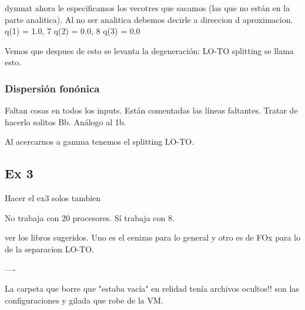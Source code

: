 dynmat ahora le especificamos los vecotres que sacamos (las que no están en la parte analitica). Al no ser analitica debemos decirle a direccion d aproximacion.
q(1) = 1.0,
7     q(2) = 0.0,
8     q(3) = 0.0

Vemos que despues de esto se levanta la degeneración: LO-TO splitting se llama esto.

\subsubsection{Dispersión fonónica}


Faltan cosas en todos los inputs. Están comentadas las líneas faltantes. Tratar de hacerlo solitos Bb. Análogo al 1b.

Al acercarnos a gamma tenemos el splitting LO-TO.



\subsection{Ex 3}

  Hacer el ex3 solos tambien

  No trabaja con 20 procesores. Sí trabaja con 8.


  ver los libros sugeridos. Uno es el cenizas para lo general y otro es de FOx para lo de la separacion LO-TO.

----

La carpeta que borre que "estaba vacía" en relidad tenía archivos ocultos!! son las configuraciones y gilada que robe de la VM.
